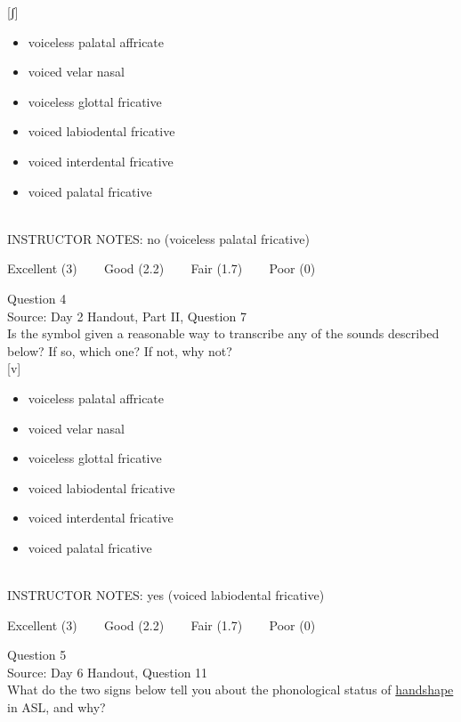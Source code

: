 \documentclass[12pt]{article}
\begin{document}
{[ʃ]}

\begin{itemize} \item voiceless palatal affricate \item voiced velar nasal \item voiceless glottal fricative \item voiced labiodental fricative \item voiced interdental fricative \item voiced palatal fricative \end{itemize}


~\\
INSTRUCTOR NOTES: no (voiceless palatal fricative)


\vfill
Excellent (3) ~~~ Good (2.2) ~~~ Fair (1.7) ~~~ Poor (0)
\newpage

{\large Question 4}\\

Source: Day 2 Handout, Part II, Question 7\\

Is the symbol given a reasonable way to transcribe any of the sounds described below? If so, which one? If not, why not?\\

{[v]}

\begin{itemize} \item voiceless palatal affricate \item voiced velar nasal \item voiceless glottal fricative \item voiced labiodental fricative \item voiced interdental fricative \item voiced palatal fricative \end{itemize}


~\\
INSTRUCTOR NOTES: yes (voiced labiodental fricative)


\vfill
Excellent (3) ~~~ Good (2.2) ~~~ Fair (1.7) ~~~ Poor (0)
\newpage

{\large Question 5}\\

Source: Day 6 Handout, Question 11\\

What do the two signs below tell you about the phonological status of \underline{handshape} in ASL, and why?\\
\end{document}

